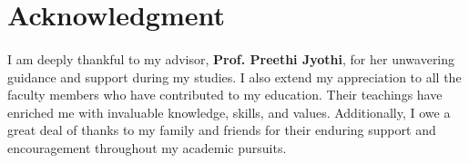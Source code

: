 \section*{\centering \textbf{\LARGE Acknowledgment}}
\paragraph{} I am deeply thankful to my advisor, \textbf{Prof. Preethi Jyothi}, for her unwavering guidance and support during my studies. I also extend my appreciation to all the faculty members who have contributed to my education. Their teachings have enriched me with invaluable knowledge, skills, and values. Additionally, I owe a great deal of thanks to my family and friends for their enduring support and encouragement throughout my academic pursuits.
